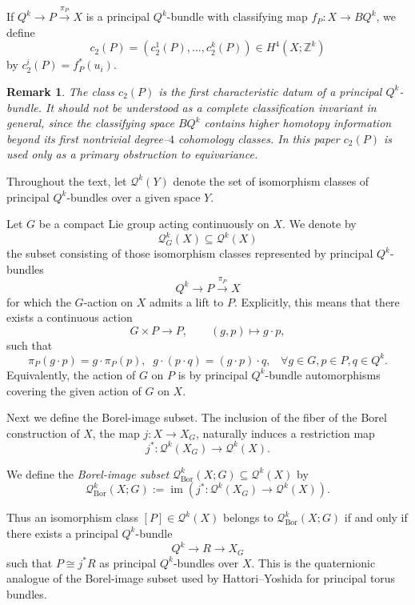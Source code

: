 \documentclass[11pt,a4paper]{article}
\numberwithin{equation}{section}
\newtheorem{remark}[definition]{Remark}
\theoremstyle{named}
\begin{document}
If $Q^k\longrightarrow P\overset{\pi_P}{\longrightarrow} X$
is a principal \(Q^k\)-bundle with classifying map $f_P:X\longrightarrow BQ^k$,
we define
\[
c_2(P)
=
(c_2^1(P),\ldots,c_2^k(P))
\in H^4(X;\mathbb Z^k)
\]
by \(c_2^i(P)=f_P^*(u_i)\).


\begin{remark}
The class \(c_2(P)\) is the first characteristic datum of a principal \(Q^k\)-bundle. It should not be understood as a complete classification invariant in general, since the classifying space \(BQ^k\) contains higher homotopy information beyond its first nontrivial degree--\(4\) cohomology classes. In this paper \(c_2(P)\) is used only as a primary obstruction to equivariance.
\end{remark}

\noindent Throughout the text, let $\mathcal{Q}^k(Y)$
denote the set of isomorphism classes of principal \(Q^k\)-bundles over a given space \(Y\).

\begin{definition}\label{def:global-lift}
Let \(G\) be a compact Lie group acting continuously on \(X\). We denote by
\[
\mathcal Q^k_G(X)\subseteq \mathcal Q^k(X)
\]
the subset consisting of those isomorphism classes represented by principal \(Q^k\)-bundles
\[
Q^k\longrightarrow P\overset{\pi_P}{\longrightarrow}X
\] for which the \(G\)-action on \(X\) admits a lift to \(P\). Explicitly, this means that there exists a continuous action
\[
G\times P\longrightarrow P,\qquad (g,p)\longmapsto g\cdot p,
\]
such that
\[
\pi_P(g\cdot p)=g\cdot \pi_P(p),\;\;
g\cdot(p\cdot q)=(g\cdot p)\cdot q,\;\;\;\forall g\in G,p\in P,q\in Q^k.
\]
 Equivalently, the action of \(G\) on \(P\) is by principal \(Q^k\)-bundle automorphisms covering the given action of \(G\) on \(X\).
\end{definition}

\noindent Next we define the Borel-image subset. The inclusion of the fiber of the Borel construction of $X$, the map $j:X\longrightarrow X_G$,
naturally induces a restriction map
\[
j^*:\mathcal{Q}^k(X_G)\longrightarrow \mathcal{Q}^k(X).
\]
\begin{definition}
We define the \emph{Borel-image subset} \(\mathcal Q^k_{\mathrm{Bor}}(X;G) \subseteq \mathcal Q^k(X)\) by\[\mathcal Q^k_{\mathrm{Bor}}(X;G) := \operatorname{im}\left(j^*:\mathcal{Q}^k(X_G)\longrightarrow\mathcal{Q}^k(X)
\right).\] 
\end{definition} 
Thus an isomorphism class $[P]\in\mathcal Q^k(X)$
belongs to \(\mathcal Q^k_{\mathrm{Bor}}(X;G)\) if and only if there exists a
principal \(Q^k\)-bundle
\[
Q^k\longrightarrow R\longrightarrow X_G
\]
such that \(P\cong j^*R
\) as principal \(Q^k\)-bundles over \(X\). This is the quaternionic analogue of the Borel-image subset used by Hattori--Yoshida for principal torus bundles.
\end{document}
